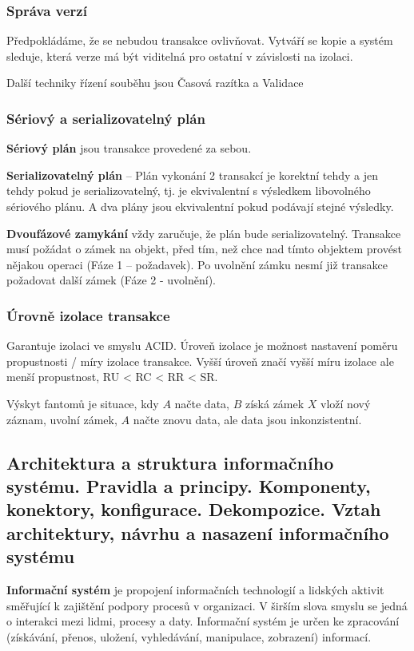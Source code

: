 \subsubsection{Správa verzí}
Předpokládáme, že se nebudou transakce ovlivňovat. Vytváří se kopie a systém sleduje, která verze má být viditelná pro ostatní v závislosti na izolaci.

Další techniky řízení souběhu jsou  Časová razítka a Validace

\subsubsection{Sériový a serializovatelný plán}
\textbf{Sériový plán} jsou transakce provedené za sebou.

\textbf{Serializovatelný plán} -- Plán vykonání 2 transakcí je korektní tehdy a jen tehdy pokud je serializovatelný, tj. je ekvivalentní s výsledkem libovolného sériového plánu. A dva plány jsou ekvivalentní pokud podávají stejné výsledky.

\textbf{Dvoufázové zamykání} vždy zaručuje, že plán bude serializovatelný. Transakce musí požádat o zámek na objekt, před tím, než chce nad tímto objektem provést nějakou operaci (Fáze 1 – požadavek). Po uvolnění zámku nesmí již transakce požadovat další zámek (Fáze 2 - uvolnění).

\subsubsection{Úrovně izolace transakce}
Garantuje izolaci ve smyslu ACID. Úroveň izolace je možnost nastavení poměru propustnosti / míry izolace transakce. Vyšší úroveň značí vyšší míru izolace ale menší propustnost, RU < RC < RR < SR.


Výskyt fantomů je situace, kdy $A$ načte data, $B$ získá zámek $X$ vloží nový záznam, uvolní zámek, $A$ načte znovu data, ale data jsou inkonzistentní.
\subsection[Architektura a struktura IS, pravidla, principy, základní pojmy]{Architektura a struktura informačního systému. Pravidla a principy. Komponenty, konektory, konfigurace. Dekompozice. Vztah architektury, návrhu a nasazení informačního systému}
\textbf{Informační systém }je propojení informačních technologií a lidských aktivit směřující k zajištění podpory procesů v organizaci. V širším slova smyslu se jedná o interakci mezi lidmi, procesy a daty. Informační systém je určen ke zpracování (získávání, přenos, uložení, vyhledávání, manipulace, zobrazení) informací.

